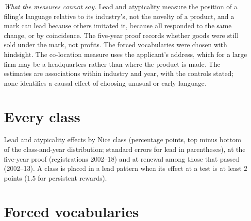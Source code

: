 \emph{What the measures cannot say.} Lead and atypicality measure the
position of a filing's language relative to its industry's, not the
novelty of a product, and a mark can lead because others imitated it,
because all responded to the same change, or by coincidence. The
five-year proof records whether goods were still sold under the mark,
not profits. The forced vocabularies were chosen with hindsight. The
co-location measure uses the applicant's address, which for a large firm
may be a headquarters rather than where the product is made. The
estimates are associations within industry and year, with the controls
stated; none identifies a causal effect of choosing unusual or early
language.

\appendix
\section{Every class}\label{app:classes}

Lead and atypicality effects by Nice class (percentage points, top minus
bottom of the class-and-year distribution; standard errors for lead in
parentheses), at the five-year proof (registrations 2002--18) and at
renewal among those that passed (2002--13). A class is placed in a lead
pattern when its effect at a test is at least 2 points (1.5 for
persistent rewards).



\section{Forced vocabularies}\label{app:vocab}

